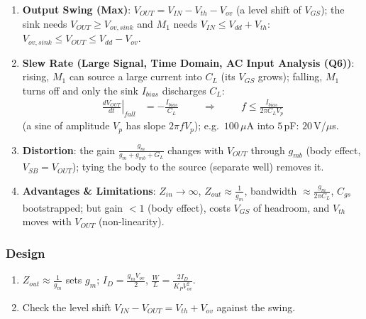 \begin{enumerate}
    \paragraph{At Output:} \(V_{in} = 0\), \(I_{test}\) into the source node (\(G_L\) removed):
    \begin{align*}
      I_{test} + I_d &= 0 \hspace{1cm} [\text{both arrive at the source node}] \\
      I_{test} - g_m V_{out} - g_{mb} V_{out} - g_o V_{out} &= 0 \hspace{1cm} [V_{gs} = V_{bs} = V_{ds} = -V_{out}] \\
      Z_{out} &= \frac{V_{out}}{I_{test}} = \frac{1}{g_m + g_{mb} + g_o} \approx \frac{1}{g_m}
    \end{align*}
  \item \textbf{Output Swing (Max)}: \(V_{OUT} = V_{IN} - V_{th} - V_{ov}\) (a level shift of \(V_{GS}\));
    the sink needs \(V_{OUT} \geq V_{ov,sink}\) and \(M_1\) needs \(V_{IN} \leq V_{dd} + V_{th}\):
    \(V_{ov,sink} \leq V_{OUT} \leq V_{dd} - V_{ov}\).
  \item \textbf{Slew Rate (Large Signal, Time Domain, AC Input Analysis (Q6))}: rising, \(M_1\) can source a large
    current into \(C_L\) (its \(V_{GS}\) grows); falling, \(M_1\) turns off and only the sink \(I_{bias}\) discharges \(C_L\):
    \begin{align*}
      \left.\frac{dV_{OUT}}{dt}\right|_{fall} &= -\frac{I_{bias}}{C_L} \hspace{1cm} \Rightarrow \hspace{1cm} f \leq \frac{I_{bias}}{2\pi C_L V_p}
    \end{align*}
    (a sine of amplitude \(V_p\) has slope \(2\pi f V_p\)); e.g.\ \(100\,\mu\)A into \(5\,\)pF: \(20\,\)V/\(\mu\)s.
  \item \textbf{Distortion}: the gain \(\frac{g_m}{g_m + g_{mb} + G_L}\) changes with \(V_{OUT}\) through \(g_{mb}\) (body effect,
    \(V_{SB} = V_{OUT}\)); tying the body to the source (separate well) removes it.
  \item \textbf{Advantages \& Limitations}: \(Z_{in} \to \infty\), \(Z_{out} \approx \frac{1}{g_m}\),
    bandwidth \(\approx \frac{g_m}{2\pi C_L}\), \(C_{gs}\) bootstrapped; but gain \(< 1\) (body effect),
    costs \(V_{GS}\) of headroom, and \(V_{th}\) moves with \(V_{OUT}\) (non-linearity).
\end{enumerate}

\subsubsection{Design}
\begin{enumerate}
  \item \(Z_{out} \approx \frac{1}{g_m}\) sets \(g_m\); \(I_D = \frac{g_m V_{ov}}{2}\), \(\frac{W}{L} = \frac{2 I_D}{K_P V_{ov}^2}\).
  \item Check the level shift \(V_{IN} - V_{OUT} = V_{th} + V_{ov}\) against the swing.
\end{enumerate}

